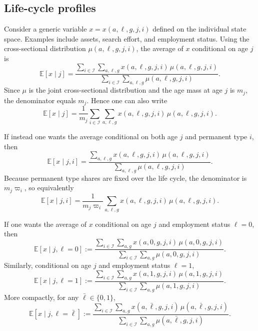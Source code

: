 \documentclass[11pt]{article}
\begin{document}
\subsection{Life-cycle profiles}

Consider a generic variable
$x=x(a,\ell,g,j,i)$ defined on the individual state space. Examples include
assets, search effort, and employment status. Using the cross-sectional
distribution $\mu(a,\ell,g,j,i)$, the average of $x$ conditional on age $j$
is
\begin{equation*}
\mathbb{E}[x\mid j]
=\frac{\sum_{i\in\mathcal{I}}\sum_{a,\ell,g}x(a,\ell,g,j,i)\,
\mu(a,\ell,g,j,i)}
{\sum_{i\in\mathcal{I}}\sum_{a,\ell,g}\mu(a,\ell,g,j,i)}.
\end{equation*}
Since $\mu$ is the joint cross-sectional distribution and the age mass at
age $j$ is $m_j$, the denominator equals $m_j$. Hence one can also write
\begin{equation*}
\mathbb{E}[x\mid j]
=\frac{1}{m_j}\sum_{i\in\mathcal{I}}\sum_{a,\ell,g}
x(a,\ell,g,j,i)\,\mu(a,\ell,g,j,i).
\end{equation*}

If instead one wants the average conditional on both age $j$ and permanent
type $i$, then
\begin{equation*}
\mathbb{E}[x\mid j,i]
=\frac{\sum_{a,\ell,g}x(a,\ell,g,j,i)\,\mu(a,\ell,g,j,i)}
{\sum_{a,\ell,g}\mu(a,\ell,g,j,i)}.
\end{equation*}
Because permanent type shares are fixed over the life cycle, the denominator
is $m_j\varpi_i$, so equivalently
\begin{equation*}
\mathbb{E}[x\mid j,i]
=\frac{1}{m_j\varpi_i}\sum_{a,\ell,g}
x(a,\ell,g,j,i)\,\mu(a,\ell,g,j,i).
\end{equation*}

If one wants the average of $x$ conditional on age $j$ and employment
status $\ell=0$, then
\begin{equation*}
\mathbb{E}[x\mid j,\ell=0]
:=\frac{\sum_{i\in\mathcal{I}}\sum_{a,g}x(a,0,g,j,i)\,\mu(a,0,g,j,i)}
{\sum_{i\in\mathcal{I}}\sum_{a,g}\mu(a,0,g,j,i)}.
\end{equation*}
Similarly, conditional on age $j$ and employment status $\ell=1$,
\begin{equation*}
\mathbb{E}[x\mid j,\ell=1]
:=\frac{\sum_{i\in\mathcal{I}}\sum_{a,g}x(a,1,g,j,i)\,\mu(a,1,g,j,i)}
{\sum_{i\in\mathcal{I}}\sum_{a,g}\mu(a,1,g,j,i)}.
\end{equation*}
More compactly, for any $\bar{\ell}\in\{0,1\}$,
\begin{equation*}
\mathbb{E}[x\mid j,\ell=\bar{\ell}]
:=\frac{\sum_{i\in\mathcal{I}}\sum_{a,g}x(a,\bar{\ell},g,j,i)\,\mu(a,\bar{\ell},g,j,i)}
{\sum_{i\in\mathcal{I}}\sum_{a,g}\mu(a,\bar{\ell},g,j,i)}.
\end{equation*}
\end{document}
